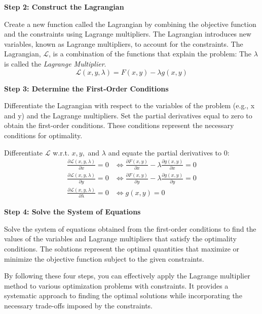 \documentclass[
  12pt,
  oneside]{book}
\theoremstyle{definition}
\theoremstyle{definition}
\theoremstyle{definition}
\theoremstyle{definition}
\theoremstyle{remark}
\begin{document}
\textbf{Step 2: Construct the Lagrangian}

Create a new function called the Lagrangian by combining the objective function
and the constraints using Lagrange multipliers. The Lagrangian introduces new variables,
known as Lagrange multipliers, to account for the constraints.
The Lagrangian, \(\mathcal{L}\), is a combination of the functions that explain the problem:
The \(\lambda\) is called the \emph{Lagrange Multiplier}.
\[
\mathcal{L}(x, y, \lambda)=F(x, y)-\lambda g(x, y)
\]

\textbf{Step 3: Determine the First-Order Conditions}

Differentiate the Lagrangian with respect to the variables of the problem (e.g., x and y)
and the Lagrange multipliers. Set the partial derivatives equal to zero to obtain
the first-order conditions. These conditions represent the necessary conditions for optimality.

Differentiate \(\mathcal{L}\) w.r.t. \(x, y,\) and \(\lambda\) and equate the partial derivatives to 0:
\begin{align*}
    \frac{\partial \mathcal{L}(x, y, \lambda)}{\partial x}=0 & \Leftrightarrow \frac{\partial F(x, y)}{\partial x}-\lambda \frac{\partial g(x, y)}{\partial x}=0 \\
    \frac{\partial \mathcal{L}(x, y, \lambda)}{\partial y}=0 & \Leftrightarrow \frac{\partial F(x, y)}{\partial y}-\lambda \frac{\partial g(x, y)}{\partial y}=0 \\
    \frac{\partial \mathcal{L}(x, y, \lambda)}{\partial \lambda}=0 & \Leftrightarrow g(x, y)=0
\end{align*}

\textbf{Step 4: Solve the System of Equations}

Solve the system of equations obtained from the first-order conditions to find the values of the variables and Lagrange multipliers that satisfy the optimality conditions. The solutions represent the optimal quantities that maximize or minimize the objective function subject to the given constraints.

By following these four steps, you can effectively apply the Lagrange multiplier method to various optimization problems with constraints. It provides a systematic approach to finding the optimal solutions while incorporating the necessary trade-offs imposed by the constraints.
\end{document}
